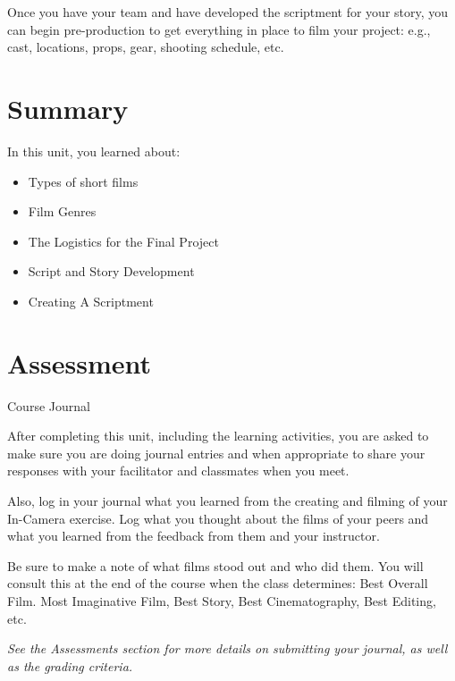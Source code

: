 \documentclass[
]{book}
\providecommand{\tightlist}{%
  \setlength{\itemsep}{0pt}\setlength{\parskip}{0pt}}
\begin{document}
\begin{reflect}
Once you have your team and have developed the scriptment for your story, you can begin pre-production to get everything in place to film your project: e.g., cast, locations, props, gear, shooting schedule, etc.
\end{reflect}

\hypertarget{summary-7}{%
\section*{Summary}\label{summary-7}}

In this unit, you learned about:

\begin{itemize}
\tightlist
\item
  Types of short films\\
\item
  Film Genres\\
\item
  The Logistics for the Final Project\\
\item
  Script and Story Development\\
\item
  Creating A Scriptment
\end{itemize}

\hypertarget{assessment-14}{%
\section*{Assessment}\label{assessment-14}}

\begin{assessment}
{Course Journal}

After completing this unit, including the learning activities, you are asked to make sure you are doing journal entries and when appropriate to share your responses with your facilitator and classmates when you meet.

Also, log in your journal what you learned from the creating and filming of your In-Camera exercise. Log what you thought about the films of your peers and what you learned from the feedback from them and your instructor.

Be sure to make a note of what films stood out and who did them. You will consult this at the end of the course when the class determines: Best Overall Film. Most Imaginative Film, Best Story, Best Cinematography, Best Editing, etc.

\emph{See the Assessments section for more details on submitting your journal, as well as the grading criteria.}
\end{assessment}
\end{document}
